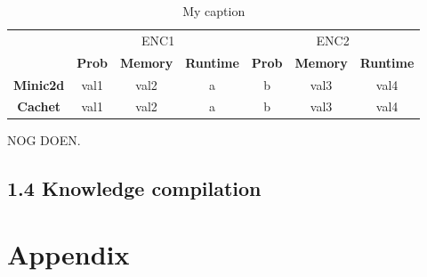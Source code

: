 \documentclass[a4paper,10pt]{report}
\begin{document}
\begin{table}[H]
\centering
\caption{My caption}
\label{my-label}
\begin{tabular}{c|c|c|c|c|c|c|}
\cline{2-7}
        & \multicolumn{3}{c|}{ENC1} & \multicolumn{3}{c|}{ENC2} \\ \cline{2-7} 
  & \textbf{Prob}  & \textbf{Memory}  & \textbf{Runtime} & \textbf{Prob}  & \textbf{Memory}  & \textbf{Runtime} \\ \cline{1-7} 
  \textbf{Minic2d} & val1  & val2    & a       & b     & val3    & val4 \\
  \hline
\textbf{Cachet}  & val1  & val2    & a       & b     & val3    & val4    \\ \cline{1-7} 
\end{tabular}
\end{table}
NOG DOEN.

\section*{1.4 Knowledge compilation}

\chapter{Appendix}
\end{document}
